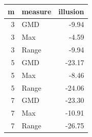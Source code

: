 \begin{tabular}{rlr}
\toprule
m & measure & illusion \\
\midrule
3 & GMD & -9.94 \\
3 & Max & -4.59 \\
3 & Range & -9.94 \\
5 & GMD & -23.17 \\
5 & Max & -8.46 \\
5 & Range & -24.06 \\
7 & GMD & -23.30 \\
7 & Max & -10.91 \\
7 & Range & -26.75 \\
\bottomrule
\end{tabular}
